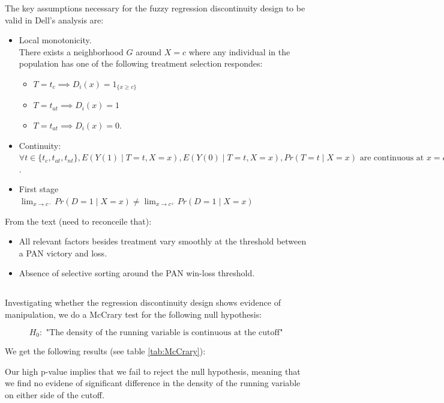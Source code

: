 \documentclass{article}
\begin{document}
The key assumptions necessary for the fuzzy regression discontinuity design to be valid in Dell's analysis are:
\begin{itemize}
    \item Local monotonicity.\\
    There exists a neighborhood \(G\) around \(X=c\) where any individual in the population has one of the following treatment selection respondes:
    \begin{itemize}
        \item \(T=t_c \implies D_i(x)=1_{\{x\geq c\}} \)
        \item \(T=t_{at} \implies D_i(x)=1\)
        \item \(T=t_{at} \implies D_i(x)=0\).
    \end{itemize}
    \item Continuity:\\
    \(\forall t \in \{t_c,t_{at},t_{nt}\}, E(Y(1)\mid T=t,X=x), E(Y(0)\mid T=t,X=x), Pr(T=t \mid X=x) \text{ are continuous at } x=c\).
    \item First stage\\
    \( \lim_{x \to c^{-}}
    Pr(D=1 \mid X=x)
    \neq
    \lim_{x \to c^{+}}
    Pr(D=1 \mid X=x) \)
\end{itemize}

From the text (need to reconceile that):
\begin{itemize}   
    \item All relevant factors besides treatment vary smoothly at the threshold between a PAN victory and loss.
    \item Absence of selective sorting around the PAN win-loss threshold.
\end{itemize}


\subsection{}

Investigating whether the regression discontinuity design shows evidence of manipulation, we do a McCrary test for the following null hypothesis:

\[H_0: \text{ "The density of the running variable is continuous at the cutoff"}\]

We get the following results (see table \ref{tab:McCrary}):


Our high p-value implies that we fail to reject the null hypothesis, meaning that we find no evidene of significant difference in the density of the running variable on either side of the cutoff.
\end{document}
